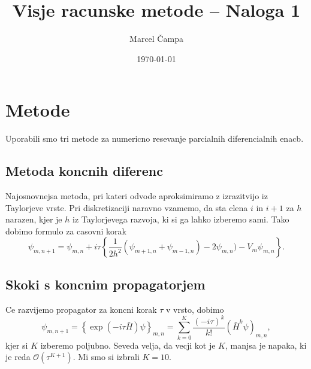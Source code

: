 \documentclass[11pt, a4paper]{article}
\title{Visje racunske metode -- Naloga 1}
\author{Marcel Čampa}
\date{\today}
\begin{document}
    \maketitle

    \section{Metode}
    Uporabili smo tri metode za numericno resevanje parcialnih diferencialnih enacb.

    \subsection{Metoda koncnih diferenc}
    Najosnovnejsa metoda, pri kateri odvode aproksimiramo z izrazitvijo iz Taylorjeve vrste.
    Pri diskretizaciji naravno vzamemo, da sta clena $i$ in $i+1$ za $h$ narazen, kjer je $h$ iz
    Taylorjevega razvoja, ki si ga lahko izberemo sami. Tako dobimo formulo za casovni korak
    \begin{equation} \label{eq:finite_diff}
        \psi_{m,n+1} = \psi_{m,n} + i \tau \left\{ \frac{1}{2h^2} (\psi_{m+1,n} + \psi_{m-1,n}) - 2 \psi_{m,n}) - V_m \psi_{m,n} \right\}.
    \end{equation}

    \subsection{Skoki s koncnim propagatorjem}
    Ce razvijemo propagator za koncni korak $\tau$ v vrsto, dobimo
    \begin{equation}
        \psi_{m,n+1} = \left\{ \exp(-i\tau \bar{H}) \psi \right\}_{m,n} = \sum_{k=0}^K \frac{(-i\tau)^k}{k!} (\bar{H}^k \psi)_{m,n},
    \end{equation}
    kjer si $K$ izberemo poljubno. Seveda velja, da vecji kot je $K$, manjsa je napaka, ki je reda $\mathcal{O}(\tau^{K+1})$. Mi smo si
    izbrali $K = 10$.
\end{document}
